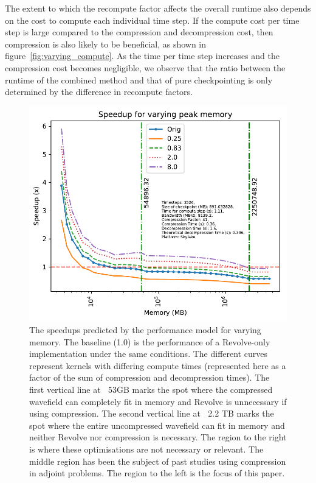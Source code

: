 \documentclass[conference]{IEEEtran}
\begin{document}
The extent to which the recompute factor affects the overall runtime also
depends on the cost to compute each individual time step. If the compute cost
per time step is large compared to the compression and decompression cost, then
compression is also likely to be beneficial, as shown in
figure~\ref{fig:varying_compute}. As the time per time step increases and the
compression cost becomes negligible, we observe that the ratio between the runtime
of the combined method and that of pure checkpointing is only determined by the
difference in recompute factors.

\begin{figure}
\begin{center}
\includegraphics[width=0.9\linewidth]{images/varying-memory.pdf}
\end{center}
\caption{The speedups predicted by the performance model for varying
  memory. The baseline
(1.0) is the performance of a Revolve-only implementation under the
same conditions. The different curves represent kernels with differing
compute times (represented here as a factor of the sum of compression
and decompression times). The first vertical line at $~$ 53GB marks the
spot where the compressed wavefield can completely fit in memory and
Revolve is unnecessary if using compression. The second vertical line
at $~$ 2.2 TB marks the spot where the entire uncompressed wavefield can
fit in memory and neither Revolve nor compression is necessary. The
region to the right is where these optimisations are not necessary or
relevant. The middle region has been the subject of past studies using
compression in adjoint problems. The region to the left is the focus
of this paper.}
\label{fig:varying_memory}
\end{figure}
\end{document}
